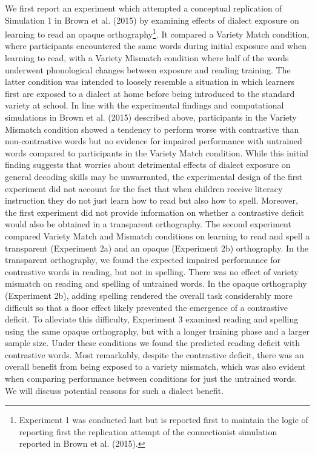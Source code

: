\documentclass[doc,floatsintext]{apa6}
\let\rmarkdownfootnote\footnote%
\def\footnote{\protect\rmarkdownfootnote}
\begin{document}
We first report an experiment which attempted a conceptual replication
of Simulation 1 in Brown et al. (2015) by examining effects of dialect
exposure on learning to read an opaque orthography\footnote{Experiment 1
  was conducted last but is reported first to maintain the logic of
  reporting first the replication attempt of the connectionist
  simulation reported in Brown et al. (2015).}. It compared a Variety
Match condition, where participants encountered the same words during
initial exposure and when learning to read, with a Variety Mismatch
condition where half of the words underwent phonological changes between
exposure and reading training. The latter condition was intended to
loosely resemble a situation in which learners first are exposed to a
dialect at home before being introduced to the standard variety at
school. In line with the experimental findings and computational
simulations in Brown et al. (2015) described above, participants in the
Variety Mismatch condition showed a tendency to perform worse with
contrastive than non-contrastive words but no evidence for impaired
performance with untrained words compared to participants in the Variety
Match condition. While this initial finding suggests that worries about
detrimental effects of dialect exposure on general decoding skills may
be unwarranted, the experimental design of the first experiment did not
account for the fact that when children receive literacy instruction
they do not just learn how to read but also how to spell. Moreover, the
first experiment did not provide information on whether a contrastive
deficit would also be obtained in a transparent orthography. The second
experiment compared Variety Match and Mismatch conditions on learning to
read and spell a transparent (Experiment 2a) and an opaque (Experiment
2b) orthography. In the transparent orthography, we found the expected
impaired performance for contrastive words in reading, but not in
spelling. There was no effect of variety mismatch on reading and
spelling of untrained words. In the opaque orthography (Experiment 2b),
adding spelling rendered the overall task considerably more difficult so
that a floor effect likely prevented the emergence of a contrastive
deficit. To alleviate this difficulty, Experiment 3 examined reading and
spelling using the same opaque orthography, but with a longer training
phase and a larger sample size. Under these conditions we found the
predicted reading deficit with contrastive words. Most remarkably,
despite the contrastive deficit, there was an overall benefit from being
exposed to a variety mismatch, which was also evident when comparing
performance between conditions for just the untrained words. We will
discuss potential reasons for such a dialect benefit.
\end{document}
